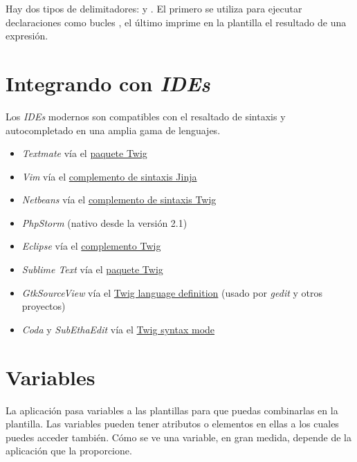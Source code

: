 \documentclass[letterpaper,10pt,spanish]{sphinxmanual}
\begin{document}
Hay dos tipos de delimitadores:  y . El primero se utiliza para ejecutar declaraciones como bucles , el último imprime en la plantilla el resultado de una expresión.


\chapter{Integrando con \emph{IDEs}}
\label{templates:integrando-con-ides}
Los \emph{IDEs} modernos son compatibles con el resaltado de sintaxis y autocompletado en una amplia gama de lenguajes.
\begin{itemize}
\item {} 
\emph{Textmate} vía el \href{https://github.com/Anomareh/PHP-Twig.tmbundle}{paquete Twig}

\item {} 
\emph{Vim} vía el \href{http://jinja.pocoo.org/2/documentation/integration}{complemento de sintaxis Jinja}

\item {} 
\emph{Netbeans} vía el \href{http://plugins.netbeans.org/plugin/37069/php-twig}{complemento de sintaxis Twig}

\item {} 
\emph{PhpStorm} (nativo desde la versión 2.1)

\item {} 
\emph{Eclipse} vía el \href{https://github.com/pulse00/Twig-Eclipse-Plugin}{complemento Twig}

\item {} 
\emph{Sublime Text} vía el \href{https://github.com/Anomareh/PHP-Twig.tmbundle}{paquete Twig}

\item {} 
\emph{GtkSourceView} vía el \href{https://github.com/gabrielcorpse/gedit-twig-template-language}{Twig language definition} (usado por \emph{gedit} y otros proyectos)

\item {} 
\emph{Coda} y \emph{SubEthaEdit} vía el \href{https://github.com/bobthecow/Twig-HTML.mode}{Twig syntax mode}

\end{itemize}


\chapter{Variables}
\label{templates:variables}
La aplicación pasa variables a las plantillas para que puedas combinarlas en la plantilla. Las variables pueden tener atributos o elementos en ellas a los cuales puedes acceder también. Cómo se ve una variable, en gran medida, depende de la aplicación que la proporcione.
\end{document}
